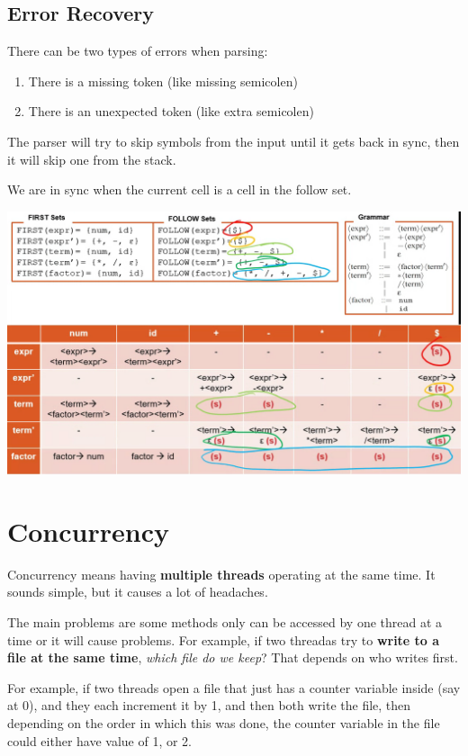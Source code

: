 \documentclass[12pt,letterpaper]{article} \usepackage{amsmath} \usepackage{graphicx} \usepackage[margin=1in]{geometry} \usepackage{longtable}  \usepackage{amssymb}
\begin{document}
	\subsection{Error Recovery}
	There can be two types of errors when parsing:
	\begin{enumerate}
		\item There is a missing token (like missing semicolen)
		\item There is an unexpected token (like extra semicolen)
	\end{enumerate}
	The parser will try to skip symbols from the input until it gets back in sync, then it will skip one from the stack. 
	
	We are in sync when the current cell is a cell in the follow set. 
	\begin{center}
		\includegraphics[width=1\linewidth]{sync-fromcoursenotes}
	\end{center}
	
	
	\section{Concurrency}
	Concurrency means having \textbf{multiple threads} operating at the same time. It sounds simple, but it causes a lot of headaches. 
	
	The main problems are some methods only can be accessed by one thread at a time or it will cause problems. For example, if two threadas try to \textbf{write to a file at the same time},\textit{ which file do we keep}? That depends on who writes first. 
	
	For example, if two threads open a file that just has a counter variable inside (say at 0), and they each increment it by 1, and then both write the file, then depending on the order in which this was done, the counter variable in the file could either have value of 1, or 2. 
	
\end{document}
